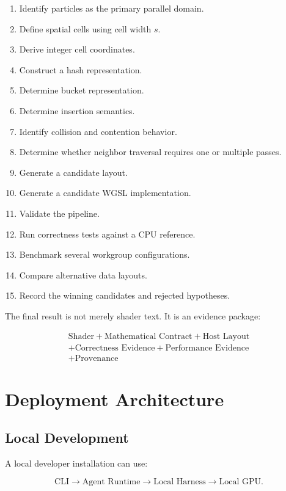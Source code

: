 \documentclass[11pt,a4paper,oneside]{report}
\begin{document}
\begin{enumerate}
  \item Identify particles as the primary parallel domain.
  \item Define spatial cells using cell width $s$.
  \item Derive integer cell coordinates.
  \item Construct a hash representation.
  \item Determine bucket representation.
  \item Determine insertion semantics.
  \item Identify collision and contention behavior.
  \item Determine whether neighbor traversal requires one or multiple passes.
  \item Generate a candidate layout.
  \item Generate a candidate WGSL implementation.
  \item Validate the pipeline.
  \item Run correctness tests against a CPU reference.
  \item Benchmark several workgroup configurations.
  \item Compare alternative data layouts.
  \item Record the winning candidates and rejected hypotheses.
\end{enumerate}

The final result is not merely shader text. It is an evidence package:

\[
\boxed{
\begin{gathered}
\text{Shader}+\text{Mathematical Contract}+\text{Host Layout}\\
+\text{Correctness Evidence}+\text{Performance Evidence}\\
+\text{Provenance}
\end{gathered}
}
\]

\chapter{Deployment Architecture}

\section{Local Development}

A local developer installation can use:

\[
\text{CLI}
\rightarrow
\text{Agent Runtime}
\rightarrow
\text{Local Harness}
\rightarrow
\text{Local GPU}.
\]
\end{document}
